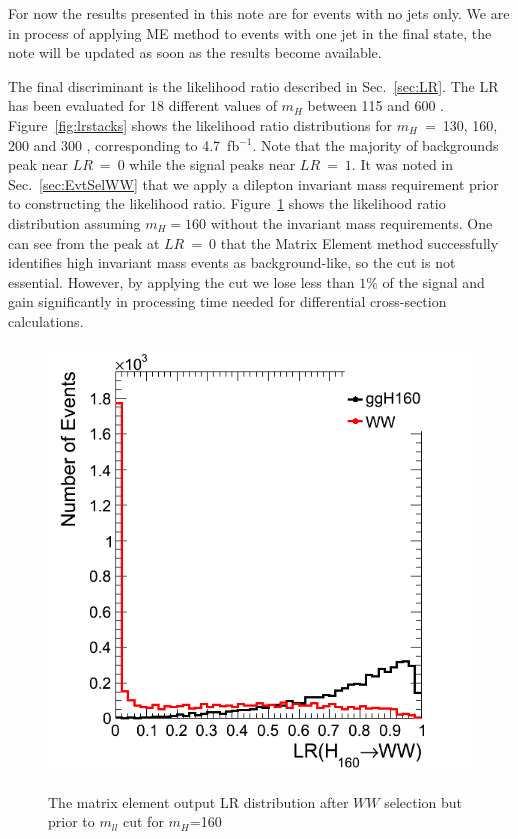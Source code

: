
For now the results presented in this note are for events with no jets only. We are in process of applying ME 
method to events with one jet in the final state, the note will be updated as soon as the results become available.

The final discriminant is the likelihood ratio described in Sec.~\ref{sec:LR}.  
The LR has been evaluated for 18 different values of $m_H$ between 115 and 600 \GeVcc.
Figure~\ref{fig:lrstacks} shows the likelihood ratio distributions for $m_H$~=~130, 160, 200 and 300 \GeVcc,               
corresponding to 4.7~fb$^{-1}$. Note that the majority of backgrounds peak near $LR~=~0$ while the signal peaks near $LR~=~1$.  
It was noted in Sec.~\ref{sec:EvtSelWW} that we apply a dilepton invariant mass requirement prior to constructing the likelihood ratio. 
Figure~\ref{fig:LR_noMll} shows the likelihood ratio distribution assuming $m_{H}=160$ \GeVcc without the invariant mass requirements.
One can see from the peak at $LR~=~0$ that the Matrix Element method successfully identifies high invariant mass events as background-like, so the cut is not essential. However, by applying the cut we lose less than $1\%$ of the signal and gain significantly in processing time needed for differential cross-section calculations.

\begin{figure}[!hbtp]                                                                                         
\centering                                                                                                                                             
\includegraphics[width=.5\textwidth]{figures/LR_noMll.png}\\                                            
\caption{The matrix element output LR distribution after $WW$ selection but prior to $m_{ll}$ cut                      
for $m_H$=160 \GeVcc}
\label{fig:LR_noMll}                                                                                          
\end{figure}

